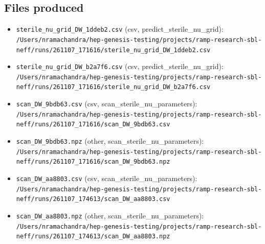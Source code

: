\documentclass[11pt,a4paper]{article}
\begin{document}
\subsection{Files produced}
\begin{itemize}
  \item \texttt{sterile\_\allowbreak{}nu\_\allowbreak{}grid\_\allowbreak{}DW\_\allowbreak{}1ddeb2.csv} (csv, predict\_sterile\_nu\_grid): \texttt{/\allowbreak{}Users/\allowbreak{}nramachandra/\allowbreak{}hep-genesis-testing/\allowbreak{}projects/\allowbreak{}ramp-research-sbl-neff/\allowbreak{}runs/\allowbreak{}261107\_\allowbreak{}171616/\allowbreak{}sterile\_\allowbreak{}nu\_\allowbreak{}grid\_\allowbreak{}DW\_\allowbreak{}1ddeb2.csv}
  \item \texttt{sterile\_\allowbreak{}nu\_\allowbreak{}grid\_\allowbreak{}DW\_\allowbreak{}b2a7f6.csv} (csv, predict\_sterile\_nu\_grid): \texttt{/\allowbreak{}Users/\allowbreak{}nramachandra/\allowbreak{}hep-genesis-testing/\allowbreak{}projects/\allowbreak{}ramp-research-sbl-neff/\allowbreak{}runs/\allowbreak{}261107\_\allowbreak{}171616/\allowbreak{}sterile\_\allowbreak{}nu\_\allowbreak{}grid\_\allowbreak{}DW\_\allowbreak{}b2a7f6.csv}
  \item \texttt{scan\_\allowbreak{}DW\_\allowbreak{}9bdb63.csv} (csv, scan\_sterile\_nu\_parameters): \texttt{/\allowbreak{}Users/\allowbreak{}nramachandra/\allowbreak{}hep-genesis-testing/\allowbreak{}projects/\allowbreak{}ramp-research-sbl-neff/\allowbreak{}runs/\allowbreak{}261107\_\allowbreak{}171616/\allowbreak{}scan\_\allowbreak{}DW\_\allowbreak{}9bdb63.csv}
  \item \texttt{scan\_\allowbreak{}DW\_\allowbreak{}9bdb63.npz} (other, scan\_sterile\_nu\_parameters): \texttt{/\allowbreak{}Users/\allowbreak{}nramachandra/\allowbreak{}hep-genesis-testing/\allowbreak{}projects/\allowbreak{}ramp-research-sbl-neff/\allowbreak{}runs/\allowbreak{}261107\_\allowbreak{}171616/\allowbreak{}scan\_\allowbreak{}DW\_\allowbreak{}9bdb63.npz}
  \item \texttt{scan\_\allowbreak{}DW\_\allowbreak{}aa8803.csv} (csv, scan\_sterile\_nu\_parameters): \texttt{/\allowbreak{}Users/\allowbreak{}nramachandra/\allowbreak{}hep-genesis-testing/\allowbreak{}projects/\allowbreak{}ramp-research-sbl-neff/\allowbreak{}runs/\allowbreak{}261107\_\allowbreak{}174613/\allowbreak{}scan\_\allowbreak{}DW\_\allowbreak{}aa8803.csv}
  \item \texttt{scan\_\allowbreak{}DW\_\allowbreak{}aa8803.npz} (other, scan\_sterile\_nu\_parameters): \texttt{/\allowbreak{}Users/\allowbreak{}nramachandra/\allowbreak{}hep-genesis-testing/\allowbreak{}projects/\allowbreak{}ramp-research-sbl-neff/\allowbreak{}runs/\allowbreak{}261107\_\allowbreak{}174613/\allowbreak{}scan\_\allowbreak{}DW\_\allowbreak{}aa8803.npz}

\end{itemize}
\end{document}

